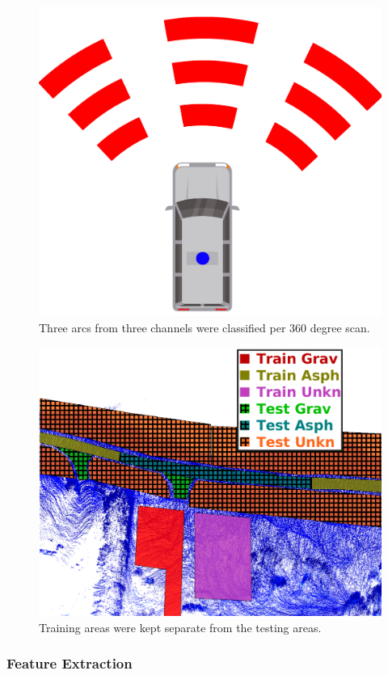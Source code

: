 \documentclass[numbered,pdftex]{ohio-etd}
\begin{document}
{{{{				\begin{figure}[H]
					\centering
					\includegraphics[width=0.25\linewidth]{Defense_Images/area_example}
					\caption[Areas to Classify]{Three arcs from three channels were classified per 360 degree scan. }
					\label{fig:area_example}
				\end{figure}
				
				\begin{figure}[H]
					\centering
					\includegraphics[width=0.75\linewidth]{Defense_Images/test_vs_train_areas_hatch}
					\caption[Training vs Testing Areas]{Training areas were kept separate from the testing areas.}
					\label{fig:test_vs_train_areas}
				\end{figure}
			
			} %
		
		\newpage
			
			\subsubsection{Feature Extraction}\label{sec:Feat_Extract} {
			
}}}}
\end{document}
